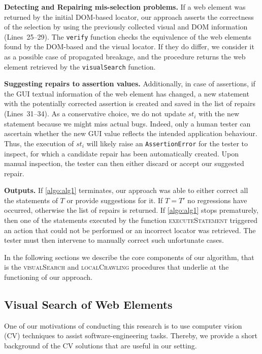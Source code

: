 \noindent
\textbf{Detecting and Repairing mis-selection problems.}
If a web element was returned by the initial DOM-based locator, our approach asserts the correctness of the selection by using the previously collected visual and DOM information (Lines~25--29). 
The \texttt{verify} function checks the equivalence of the web elements found by the DOM-based and the visual locator. If they do differ, we consider it as a possible case of propagated breakage, and the procedure returns the web element retrieved by the \texttt{visualSearch} function.

\noindent
\textbf{Suggesting repairs to assertion values.}
Additionally, in case of assertions, if the GUI textual information of the web element has changed, a new statement with the potentially corrected assertion is created and saved in the list of repairs (Lines~31--34). As a conservative choice, we do not update $st_i$ with the new statement because we might miss actual bugs.
Indeed, only a human tester can ascertain whether the new GUI value reflects the intended application behaviour. Thus, the execution of $st_i$ will likely raise an \texttt{AssertionError} for the tester to inspect, for which a candidate repair has been automatically created. Upon manual inspection, the tester can then either discard or accept our suggested repair.

\noindent
\textbf{Outputs.}
If \autoref{algo:alg1} terminates, our approach was able to either correct all the statements of $T$ or provide suggestions for it. 
 If $T = T'$ no regressions have occurred, otherwise the list of repairs is returned.
If \autoref{algo:alg1} stops prematurely, then one of the statements executed by the function \textsc{executeStatement} triggered an action that could not be performed or an incorrect locator was retrieved. The tester must then intervene to manually correct such unfortunate cases.

In the following sections we describe the core components of our algorithm, that is the \textsc{visualSearch} and \textsc{localCrawling} procedures that underlie at the functioning of our approach.

\subsection{Visual Search of Web Elements}\label{sec:vis}

One of our motivations of conducting this research is to use computer vision (CV) techniques to assist software-engineering tasks. 
Thereby, we provide a short background of the CV solutions that are useful in our setting.

